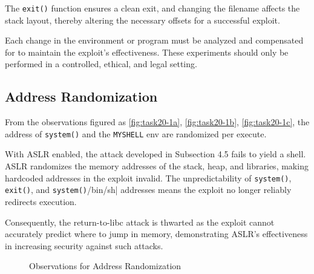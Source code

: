 \documentclass[a4paper,11pt]{article}
\begin{document}
The \verb|exit()| function ensures a clean exit, and changing the filename affects the stack layout, thereby altering the necessary offsets for a successful exploit.

Each change in the environment or program must be analyzed and compensated for to maintain the exploit's effectiveness. These experiments should only be performed in a controlled, ethical, and legal setting.

\subsection{Address Randomization}
From the observations figured as \ref{fig:task20-1a}, \ref{fig:task20-1b}, \ref{fig:task20-1c}, the address of \verb|system()| and the \verb|MYSHELL| env are randomized per execute.

With ASLR enabled, the attack developed in Subsection 4.5 fails to yield a shell. ASLR randomizes the memory addresses of the stack, heap, and libraries, making hardcoded addresses in the exploit invalid. The unpredictability of \verb|system()|, \verb|exit()|, and \verb|system()|/bin/sh| addresses means the exploit no longer reliably redirects execution. 

Consequently, the return-to-libc attack is thwarted as the exploit cannot accurately predict where to jump in memory, demonstrating ASLR's effectiveness in increasing security against such attacks.

\begin{figure}[h]
    \centering
    \hfill
    \hfill
    \hfill
    \caption{Observations for Address Randomization}\label{fig:task20}
\end{figure}
\end{document}
